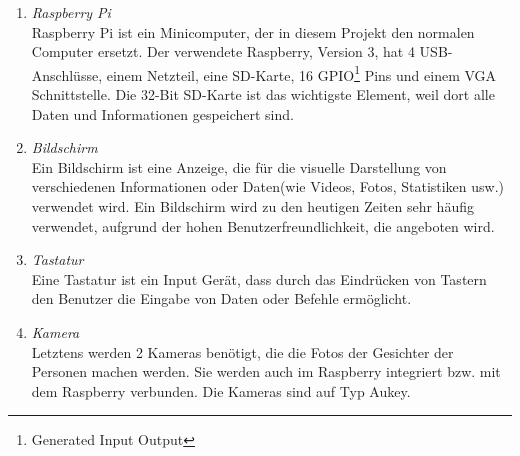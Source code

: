 \begin{enumerate}
	\item \textit{Raspberry Pi} \\
	Raspberry Pi ist ein Minicomputer, der in diesem Projekt den normalen Computer ersetzt. Der verwendete Raspberry, Version 3, hat 4 USB-Anschlüsse, einem Netzteil, eine SD-Karte, 16 GPIO\footnote{Generated Input Output} Pins und einem VGA Schnittstelle. Die 32-Bit SD-Karte ist das wichtigste Element, weil dort alle Daten und Informationen gespeichert sind.
	\item \textit{Bildschirm} \\
	Ein Bildschirm ist eine Anzeige, die für die visuelle Darstellung von verschiedenen Informationen oder Daten(wie Videos, Fotos, Statistiken usw.) verwendet wird. Ein Bildschirm wird zu den heutigen Zeiten sehr häufig verwendet, aufgrund der hohen Benutzerfreundlichkeit, die angeboten wird.
	\item \textit{Tastatur} \\
	Eine Tastatur ist ein Input Gerät, dass durch das Eindrücken von Tastern den Benutzer die Eingabe von Daten oder Befehle ermöglicht.
	\item \textit{Kamera} \\
	Letztens werden 2 Kameras benötigt, die die Fotos der Gesichter der Personen machen werden. Sie werden auch im Raspberry integriert bzw. mit dem Raspberry verbunden. Die Kameras sind auf Typ Aukey.
\end{enumerate}
